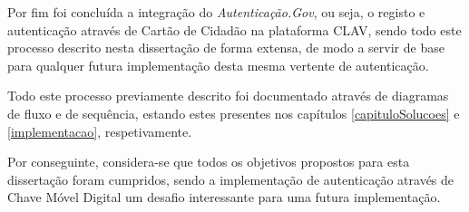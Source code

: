Por fim foi concluída a integração do \emph{Autenticação.Gov}, ou seja, o registo e autenticação através de Cartão de Cidadão na plataforma CLAV, sendo todo este processo descrito nesta dissertação de forma extensa, de modo a servir de base para qualquer futura implementação desta mesma vertente de autenticação.

Todo este processo previamente descrito foi documentado através de diagramas de fluxo e de sequência, estando estes presentes nos capítulos \ref{capituloSolucoes} e \ref{implementacao}, respetivamente.

Por conseguinte, considera-se que todos os objetivos propostos para esta dissertação foram cumpridos, sendo a implementação de autenticação através de Chave Móvel Digital um desafio interessante para uma futura implementação.